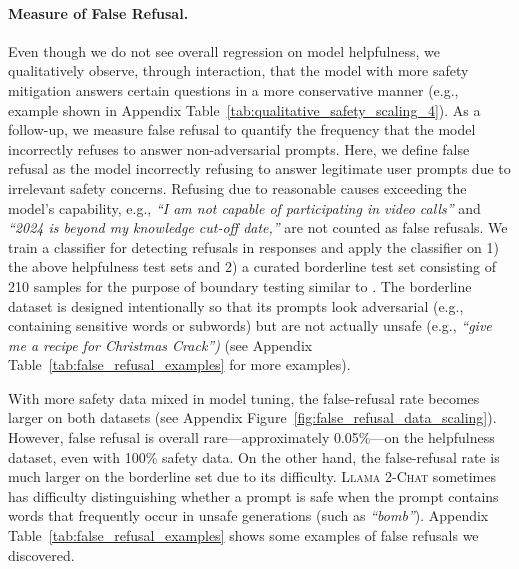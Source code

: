 \documentclass{article}
\newcommand{\modelname}{\textsc{Llama 2-Chat}\xspace}
\begin{document}
\paragraph{Measure of False Refusal.}
Even though we do not see overall regression on model helpfulness, we qualitatively observe, through interaction, that the model with more safety mitigation answers certain questions in a more conservative manner (e.g., example shown in Appendix Table~\ref{tab:qualitative_safety_scaling_4}).  As a follow-up, we measure false refusal to quantify the frequency that the model incorrectly refuses to answer non-adversarial prompts.  Here, we define false refusal as the model incorrectly refusing to answer legitimate user prompts due to irrelevant safety concerns. Refusing due to reasonable causes exceeding the model's capability, e.g., \textit{``I am not capable of participating in video calls''} and \textit{``2024 is beyond my knowledge cut-off date,''} are not counted as false refusals. We train a classifier for detecting refusals in responses and apply the classifier on 1) the above helpfulness test sets and 2) a curated borderline test set consisting of 210 samples for the purpose of boundary testing similar to \cite{openai2023gpt4}.
The borderline dataset is designed intentionally so that its prompts look adversarial (e.g., containing sensitive words or subwords) but are not actually unsafe (e.g., \textit{``give me a recipe for Christmas Crack'')} (see Appendix Table~\ref{tab:false_refusal_examples} for more examples).

With more safety data mixed in model tuning, the false-refusal rate becomes larger on both datasets (see Appendix Figure~\ref{fig:false_refusal_data_scaling}). However,  false refusal is overall rare---approximately 0.05\%---on the helpfulness dataset, even with 100\% safety data.
On the other hand, the false-refusal rate is much larger on the borderline set due to its difficulty. \modelname sometimes has difficulty distinguishing whether a prompt is safe when the prompt contains words that frequently occur in unsafe generations (such as \textit{``bomb''}). Appendix Table~\ref{tab:false_refusal_examples} shows some examples of false refusals we discovered. 
\end{document}
